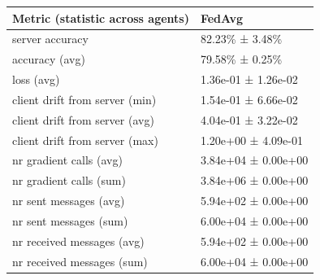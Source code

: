 \begin{tabular}{ll}
\hline
 Metric (statistic across agents)   & FedAvg              \\
\hline
 server accuracy                    & 82.23\% ± 3.48\%      \\
 accuracy (avg)                     & 79.58\% ± 0.25\%      \\
 loss (avg)                         & 1.36e-01 ± 1.26e-02 \\
 client drift from server (min)     & 1.54e-01 ± 6.66e-02 \\
 client drift from server (avg)     & 4.04e-01 ± 3.22e-02 \\
 client drift from server (max)     & 1.20e+00 ± 4.09e-01 \\
 nr gradient calls (avg)            & 3.84e+04 ± 0.00e+00 \\
 nr gradient calls (sum)            & 3.84e+06 ± 0.00e+00 \\
 nr sent messages (avg)             & 5.94e+02 ± 0.00e+00 \\
 nr sent messages (sum)             & 6.00e+04 ± 0.00e+00 \\
 nr received messages (avg)         & 5.94e+02 ± 0.00e+00 \\
 nr received messages (sum)         & 6.00e+04 ± 0.00e+00 \\
\hline
\end{tabular}